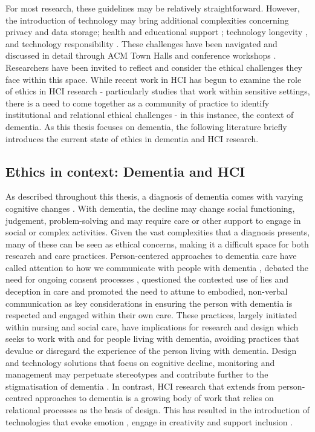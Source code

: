 For most research, these guidelines may be relatively straightforward. However, the introduction of technology may bring additional complexities concerning privacy and data storage; health and educational support \citep{gray2016inscribing}; technology longevity \citep{foley_printer_2019}, and technology responsibility \citep{ferrario_software_2014}. These challenges have been navigated and discussed in detail through ACM Town Halls and conference workshops \citep{frauenberger_research_2017,munteanu_sigchi_2019,waycott_ethical_2015}. Researchers have been invited to reflect and consider the ethical challenges they face within this space. While recent work in HCI has begun to examine the role of ethics in HCI research - particularly studies that work within sensitive settings, there is a need to come together as a community of practice to identify institutional and relational ethical challenges - in this instance, the context of dementia. As this thesis focuses on dementia, the following literature briefly introduces the current state of ethics in dementia and HCI research.

\subsection{Ethics in context: Dementia and HCI}
\label{RelatedWork:DementiaandHCI}
As described throughout this thesis, a diagnosis of dementia comes with varying cognitive changes \citep{hampson_dementia:_2016}. With dementia, the decline may change social functioning, judgement, problem-solving and may require care or other support to engage in social or complex activities. Given the vast complexities that a diagnosis presents, many of these can be seen as ethical concerns, making it a difficult space for both research and care practices. Person-centered approaches to dementia care have called attention to how we communicate with people with dementia \citep{oyebode_mental_2005}, debated the need for ongoing consent processes \citep{dewing_participatory_2007}, questioned the contested use of lies and deception in care \citep{elvish_lying_2010} and promoted the need to attune to embodied, non-verbal communication \citep{group_patron_2019,twigg_dress_2013} as key considerations in ensuring the person with dementia is respected and engaged within their own care. These practices, largely initiated within nursing and social care, have implications for research and design which seeks to work with and for people living with dementia, avoiding practices that devalue or disregard the experience of the person living with dementia. Design and technology solutions that focus on cognitive decline, monitoring and management may perpetuate stereotypes and contribute further to the stigmatisation of dementia \citep{low2020negative}. In contrast, HCI research that extends from person-centred approaches to dementia is a growing body of work that relies on relational processes as the basis of design. This has resulted in the introduction of technologies that evoke emotion \citep{wallace_enabling_2012-1,houben_foregrounding_2019,dixon_approach_2020} , engage in creativity \citep{lindsay_empathy_2012,morrissey_im_2016} and support inclusion \citep{welsh_ticket_2018,foley_printer_2019,treadaway_sensor_2016}.

